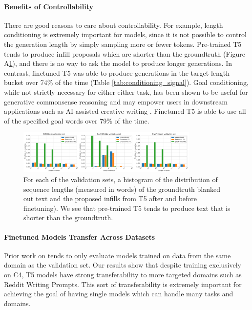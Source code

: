 \paragraph{Benefits of Controllability}
There are good reasons to care about controllability.
For example, length conditioning is extremely important for \FitB models, since it is not possible to control the generation length by simply sampling more or fewer tokens.
Pre-trained T5 tends to produce infill proposals which are shorter than the groundtruth (Figure A\ref{fig:t5_lengths}), and there is no way to ask the model to produce longer generations.
In contrast, finetuned T5 was able to produce generations in the target length bucket over 74\% of the time (Table \ref{tab:conditioning_signal}).
Goal conditioning, while not strictly necessary for either either task, has been shown to be useful for generative commonsense reasoning \citep{lin2020commongen} and may empower users in downstream applications such as AI-assisted creative writing \citep{roemmele2021inspiration}. 
Finetuned T5 is able to use all of the specified goal words over 79\% of the time.


\begin{figure}
    \centering
    \includegraphics[width=0.8\textwidth]{figures/t5_lengths}
    \caption{For each of the \FitB{} validation sets, a histogram of the distribution of sequence lengths (measured in words) of the {groundtruth} blanked out text and the proposed infills from T5 {after} and {before} finetuning). We see that pre-trained T5 tends to produce text that is shorter than the groundtruth.}
    \label{fig:t5_lengths}
\end{figure}

\paragraph{Finetuned Models Transfer Across Datasets}
Prior work on \FitB{} tends to only evaluate models trained on data from the same domain as the validation set.
Our results show that despite training exclusively on C4, T5 models have strong transferability to more targeted domains such as Reddit Writing Prompts.
This sort of transferability is extremely important for achieving the goal of having single models which can handle many tasks and domains.

